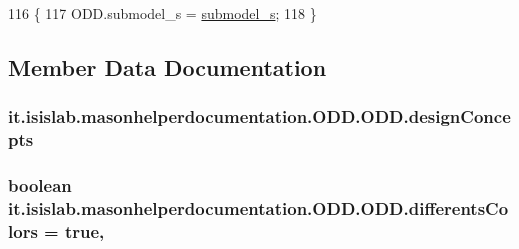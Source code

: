 \begin{DoxyCode}
116                                                             \{
117         ODD.submodel\_s = \hyperlink{classit_1_1isislab_1_1masonhelperdocumentation_1_1_o_d_d_1_1_o_d_d_a1da5e6dcf76e4a83ec91831f5ab98bf2}{submodel\_s};
118     \}
\end{DoxyCode}


\subsection{Member Data Documentation}
\hypertarget{classit_1_1isislab_1_1masonhelperdocumentation_1_1_o_d_d_1_1_o_d_d_a6be57819872ca078db4b2791ef8ddc8f}{
\subsubsection[{design\-Concepts}]{ it.\-isislab.\-masonhelperdocumentation.\-O\-D\-D.\-O\-D\-D.\-design\-Concepts\hspace{0.3cm}{\ttfamily [static]}}}\label{classit_1_1isislab_1_1masonhelperdocumentation_1_1_o_d_d_1_1_o_d_d_a6be57819872ca078db4b2791ef8ddc8f}
\hypertarget{classit_1_1isislab_1_1masonhelperdocumentation_1_1_o_d_d_1_1_o_d_d_ab09b176537cd5e168d67fc16112444dc}{
\subsubsection[{differents\-Colors}]{\setlength{\rightskip}{0pt plus 5cm}boolean it.\-isislab.\-masonhelperdocumentation.\-O\-D\-D.\-O\-D\-D.\-differents\-Colors = true\hspace{0.3cm}{\ttfamily [static]}, {\ttfamily [private]}}}\label{classit_1_1isislab_1_1masonhelperdocumentation_1_1_o_d_d_1_1_o_d_d_ab09b176537cd5e168d67fc16112444dc}
